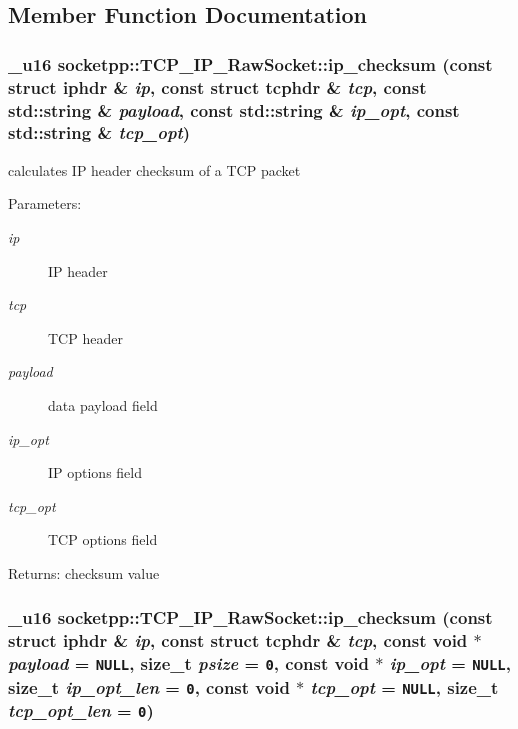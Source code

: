 \subsection{Member Function Documentation}
\hypertarget{classsocketpp_1_1TCP__IP__RawSocket_1fcccb3c1d1454997c08e7afe1518df7}{
\subsubsection[{ip\_\-checksum}]{\setlength{\rightskip}{0pt plus 5cm}\_\-u16 socketpp::TCP\_\-IP\_\-RawSocket::ip\_\-checksum (const struct iphdr \& {\em ip}, \/  const struct tcphdr \& {\em tcp}, \/  const std::string \& {\em payload}, \/  const std::string \& {\em ip\_\-opt}, \/  const std::string \& {\em tcp\_\-opt})}}
\label{classsocketpp_1_1TCP__IP__RawSocket_1fcccb3c1d1454997c08e7afe1518df7}


calculates IP header checksum of a TCP packet 

\begin{Desc}
\item[Parameters:]
\begin{description}
\item[{\em ip}]IP header \item[{\em tcp}]TCP header \item[{\em payload}]data payload field \item[{\em ip\_\-opt}]IP options field \item[{\em tcp\_\-opt}]TCP options field \end{description}
\end{Desc}
\begin{Desc}
\item[Returns:]checksum value \end{Desc}
\hypertarget{classsocketpp_1_1TCP__IP__RawSocket_abc1c7904d5086de03ab11ae151813a7}{
\subsubsection[{ip\_\-checksum}]{\setlength{\rightskip}{0pt plus 5cm}\_\-u16 socketpp::TCP\_\-IP\_\-RawSocket::ip\_\-checksum (const struct iphdr \& {\em ip}, \/  const struct tcphdr \& {\em tcp}, \/  const void $\ast$ {\em payload} = {\tt NULL}, \/  size\_\-t {\em psize} = {\tt 0}, \/  const void $\ast$ {\em ip\_\-opt} = {\tt NULL}, \/  size\_\-t {\em ip\_\-opt\_\-len} = {\tt 0}, \/  const void $\ast$ {\em tcp\_\-opt} = {\tt NULL}, \/  size\_\-t {\em tcp\_\-opt\_\-len} = {\tt 0})}}
\label{classsocketpp_1_1TCP__IP__RawSocket_abc1c7904d5086de03ab11ae151813a7}


